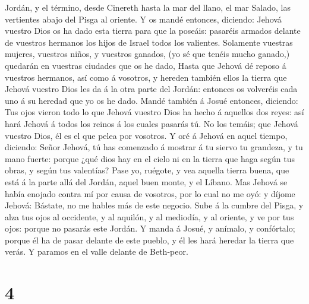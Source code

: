 Jordán, y el término, desde Cinereth hasta la mar del llano, el mar
Salado, las vertientes abajo del Pisga al oriente.  Y os
mandé entonces, diciendo: Jehová vuestro Dios os ha dado esta tierra
para que la poseáis: pasaréis armados delante de vuestros hermanos los
hijos de Israel todos los valientes.  Solamente vuestras
mujeres, vuestros niños, y vuestros ganados, (yo sé que tenéis mucho
ganado,) quedarán en vuestras ciudades que os he dado, 
Hasta que Jehová dé reposo á vuestros hermanos, así como á vosotros, y
hereden también ellos la tierra que Jehová vuestro Dios les da á la otra
parte del Jordán: entonces os volveréis cada uno á su heredad que yo os
he dado.  Mandé también á Josué entonces, diciendo: Tus
ojos vieron todo lo que Jehová vuestro Dios ha hecho á aquellos dos
reyes: así hará Jehová á todos los reinos á los cuales pasarás tú.
 No los temáis; que Jehová vuestro Dios, él es el que pelea
por vosotros.  Y oré á Jehová en aquel tiempo, diciendo:
 Señor Jehová, tú has comenzado á mostrar á tu siervo tu
grandeza, y tu mano fuerte: porque ¿qué dios hay en el cielo ni en la
tierra que haga según tus obras, y según tus valentías? 
Pase yo, ruégote, y vea aquella tierra buena, que está á la parte allá
del Jordán, aquel buen monte, y el Líbano.  Mas Jehová se
había enojado contra mí por causa de vosotros, por lo cual no me oyó: y
díjome Jehová: Bástate, no me hables más de este negocio. 
Sube á la cumbre del Pisga, y alza tus ojos al occidente, y al aquilón,
y al mediodía, y al oriente, y ve por tus ojos: porque no pasarás este
Jordán.  Y manda á Josué, y anímalo, y confórtalo; porque
él ha de pasar delante de este pueblo, y él les hará heredar la tierra
que verás.  Y paramos en el valle delante de Beth-peor.

\hypertarget{section-3}{%
\section{4}\label{section-3}}

